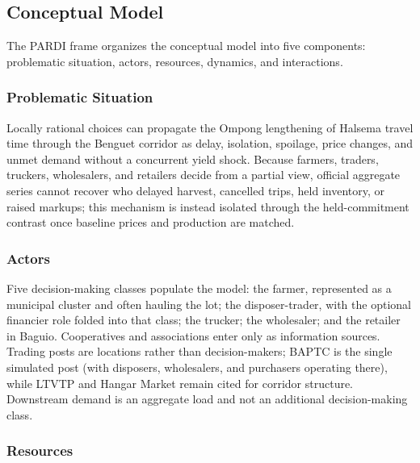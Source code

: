 \documentclass{icsthesis}
\begin{document}
\begin{mainmatter}
		\subsection{Conceptual Model}

			The PARDI frame \citep{Etienne2016} organizes the conceptual model into five components: problematic situation, actors, resources, dynamics, and interactions.

			\subsubsection{Problematic Situation}

			Locally rational choices can propagate the Ompong lengthening of Halsema travel time through the Benguet corridor as delay, isolation, spoilage, price changes, and unmet demand without a concurrent yield shock. Because farmers, traders, truckers, wholesalers, and retailers decide from a partial view, official aggregate series cannot recover who delayed harvest, cancelled trips, held inventory, or raised markups; this mechanism is instead isolated through the held-commitment contrast once baseline prices and production are matched.

			\subsubsection{Actors}

			Five decision-making classes populate the model: the farmer, represented as a municipal cluster and often hauling the lot; the disposer-trader, with the optional financier role folded into that class; the trucker; the wholesaler; and the retailer in Baguio. Cooperatives and associations enter only as information sources. Trading posts are locations rather than decision-makers; BAPTC is the single simulated post (with disposers, wholesalers, and purchasers operating there), while LTVTP and Hangar Market remain cited for corridor structure. Downstream demand is an aggregate load and not an additional decision-making class.

			\subsubsection{Resources}


\end{mainmatter}
\end{document}
